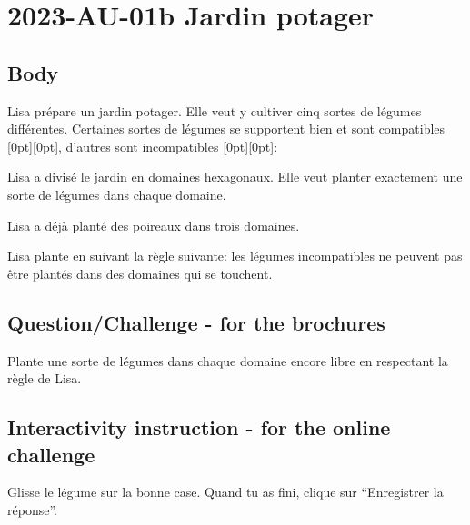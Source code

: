 \documentclass[a4paper,11pt]{report}
\newcommand{\taskGraphicsFolder}{..}
\begin{document}
\section*{\centering{} 2023-AU-01b Jardin potager}


\subsection*{Body}

Lisa prépare un jardin potager. Elle veut y cultiver cinq sortes de légumes différentes. Certaines sortes de légumes se supportent bien et sont compatibles \raisebox{-0.5ex}[0pt][0pt]{}, d’autres sont incompatibles \raisebox{-0.5ex}[0pt][0pt]{}:

{\centering%
\par}

Lisa a divisé le jardin en domaines hexagonaux. Elle veut planter exactement une sorte de légumes dans chaque domaine.

Lisa a déjà planté des poireaux \raisebox{-0.5ex}{} dans trois domaines.

{\centering%
\par}

Lisa plante en suivant la règle suivante: les légumes incompatibles ne peuvent pas être plantés dans des domaines qui se touchent.

{\em


\subsection*{Question/Challenge - for the brochures}

Plante une sorte de légumes dans chaque domaine encore libre en respectant la règle de Lisa.

}


\subsection*{Interactivity instruction - for the online challenge}

Glisse le légume sur la bonne case. Quand tu as fini, clique sur “Enregistrer la réponse”.
\end{document}
